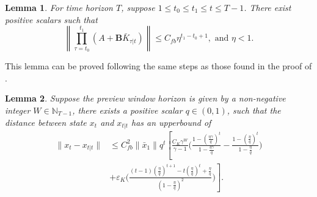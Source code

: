 \documentclass[letterpaper, 10 pt, conference]{ieeeconf}  %
\newtheorem{lemma}{Lemma}
\begin{document}
\begin{lemma}\label{lemma:multGain}
    For time horizon $T$, suppose $1\leq t_{0} \leq t_{1}\leq t\leq T-1$. There exist positive scalars such that
    \begin{equation*}
        \left \| \prod_{\tau=t_{0}}^{t_{1}}(A+\mathbf{B}\bar{K}_{\tau|t})  \right\| \leq C_{fb}\eta^{t_{1}-t_{0}+1},\text{ and }\eta<1.
    \end{equation*}
\end{lemma}
This lemma can be proved following the same steps as those found in the proof of \cite[Appendix E,Proposition 2]{zhang_regret_2021}.
\begin{lemma}
    Suppose the preview window horizon is given by a non-negative integer $W\in\mathbb{N}_{T-1}$, there exists a positive scalar $q\in(0,1)$, such that the distance between state $x_{t}$ and $x_{t|t}$ has an upperbound of
    \begin{equation*}
    \begin{split}
        \|x_{t}-x_{t|t}\| &\leq C_{fb}^{2}\|\bar{x}_{1}\|q^{t} \left [\frac{C_{K}\gamma^{W}}{\gamma-1}\bigg(\frac{1-(\frac{\eta\gamma}{q})^{t}}{1-\frac{\eta\gamma}{q}} - \frac{1-(\frac{\eta}{q})^{t}}{1-\frac{\eta}{q}} \bigg) \right .\\
        &\left . +\varepsilon_{K}\bigg(\frac{(t-1)(\frac{\eta}{q})^{t+1}-t(\frac{\eta}{q})^{t}+\frac{\eta}{q}}{(1-\frac{\eta}{q})^{2}}\bigg) \right ].  \end{split}
    \end{equation*}
\end{lemma}
\end{document}
